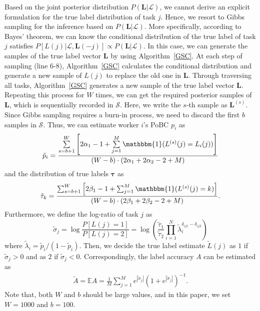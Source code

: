 Based on the joint posterior distribution $P(\bm{L}|\mathcal{L})$, we cannot derive an explicit formulation for the true label distribution of task $j$. Hence, we resort to Gibbs sampling for the inference based on $P(\bm{L}|\mathcal{L})$.
More specifically, according to Bayes' theorem, we can know the conditional distribution of the true label of task $j$ satisfies
$P[L(j)|\mathcal{L}, \bm{L}(-j)]\propto P(\bm{L}|\mathcal{L})$.
In this case, we can generate the samples of the true label vector $\bm{L}$ by using Algorithm~\ref{GSC}.
At each step of sampling (line 6-8), Algorithm~\ref{GSC} calculates the conditional distribution and generate a new sample of $L(j)$ to replace the old one in $\bm{L}$.
Through traversing all tasks, Algorithm~\ref{GSC} generates a new sample of the true label vector $\bm{L}$.
Repeating this process for $W$ times, we can get the required posterior samples of $\bm{L}$, which is sequentially recorded in $\mathcal{S}$.
Here, we write the $s$-th sample as $\bm{L}^{(s)}$.
Since Gibbs sampling requires a burn-in process, we need to discard the first $b$ samples in $\mathcal{S}$.
Thus, we can estimate worker $i$'s PoBC $p_i$ as
\begin{equation}
\label{p_infer}
\tilde{p}_{i}=\frac{\sum\limits_{s=b+1}^{W}\left[2\alpha_{1}-1+\sum\limits_{j=1}^{M}\mathbbm{1}(L^{(s)}(j)=L_{i}(j))\right]}{(W-b)\cdot(2\alpha_{1}+2\alpha_{2}-2+M)}
\end{equation}
and the distribution of true labels $\bm{\tau}$ as
\begin{equation}
\label{tau_infer}
\tilde{\tau}_{k}=\frac{\sum_{s=b+1}^{W}\left[2\beta_{1}-1+\sum_{j=1}^{M}\mathbbm{1}(L^{(s)}(j)=k)\right]}{(W-b)\cdot(2\beta_{1}+2\beta_{2}-2+M)}.
\end{equation}
Furthermore, we define the log-ratio of task $j$ as
\begin{equation}
\label{ProbRatio}
\tilde{\sigma}_j=\log\frac{P[L(j)=1]}{P[L(j)=2]}=\log\left(\frac{\tilde{\tau}_1}{\tilde{\tau}_2}\prod_{i=1}^{N}\tilde{\lambda}_i^{\delta_{ij1}-\delta_{ij2}}\right)
\end{equation}
where $\tilde{\lambda}_i = \tilde{p}_i/(1-\tilde{p}_i)$.
Then, we decide the true label estimate $\tilde{L}(j)$ as $1$ if $\tilde{\sigma}_j>0$ and as $2$ if $\tilde{\sigma}_j<0$.
Correspondingly, the label accuracy $A$ can be estimated as
\begin{equation}
\label{vot}
\begin{split}
\tilde{A}=\mathbb{E}A = \frac{1}{M}{\sum}_{j=1}^{M}e^{|\tilde{\sigma}_j|}\left(1+e^{|\tilde{\sigma}_j|}\right)^{-1}.
\end{split}
\end{equation}
Note that, both $W$ and $b$ should be large values, and in this paper, we set $W=1000$ and $b=100$.

